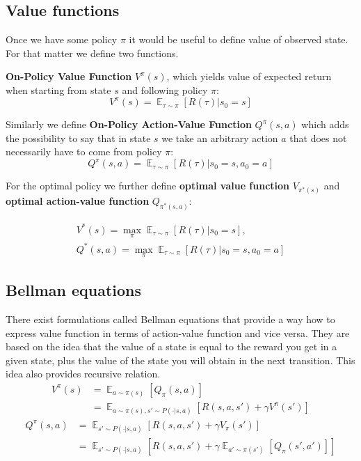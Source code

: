 \subsection*{Value functions}
Once we have some policy $\pi$ it would be useful to define value of observed state. 
For that matter we define two functions.

\textbf{On-Policy Value Function} $V^\pi(s)$, which yields value of expected return when starting from state $s$ and following policy $\pi$:
$$V^\pi(s) = \mathop{\mathbb{E}}_{\tau \sim \pi}[R(\tau)|s_0=s]$$

Similarly we define \textbf{On-Policy Action-Value Function} $Q^\pi(s,a)$ which adds the possibility to say that in state $s$ we take an arbitrary action $a$ that does not necessarily have to come from policy $\pi$:
$$Q^\pi(s,a) = \mathop{\mathbb{E}}_{\tau \sim \pi}[R(\tau)|s_0=s,a_0=a]$$

For the optimal policy we further define \textbf{optimal value function} $V_{\pi^*(s)}$ and \textbf{optimal action-value function} $Q_{\pi^*(s,a)}$:

\begin{gather*}
    V^*(s) = \max_\pi \mathop{\mathbb{E}}_{\tau \sim \pi}[R(\tau)|s_0=s], \\
    Q^*(s,a) = \max_\pi \mathop{\mathbb{E}}_{\tau \sim \pi}[R(\tau)|s_0=s,a_0=a]
\end{gather*}

\subsection*{Bellman equations}
There exist formulations called Bellman equations that provide a way how to express value function in terms of action-value function and vice versa.
They are based on the idea that the value of a state is equal to the reward you get in a given state, plus the value of the state you will obtain in the next transition. 
This idea also provides recursive relation.
\begin{align*}
    V^\pi(s) &= \mathop{\mathbb{E}}_{a \sim \pi(s)} [Q_\pi(s,a)] \\
    &= \mathop{\mathbb{E}}_{a \sim \pi(s), s' \sim P(\cdot|s,a)} [R(s,a, s') + \gamma V^\pi(s')]
\end{align*}
\begin{align*}
    Q^\pi(s,a) &= \mathop{\mathbb{E}}_{s' \sim P(\cdot|s,a)} [R(s,a,s') + \gamma V_\pi(s')] \\
    &= \mathop{\mathbb{E}}_{s' \sim P(\cdot|s,a)} [R(s,a,s') + \gamma \mathop{\mathbb{E}}_{a' \sim \pi(s')} [Q_\pi(s',a')]]
\end{align*}

